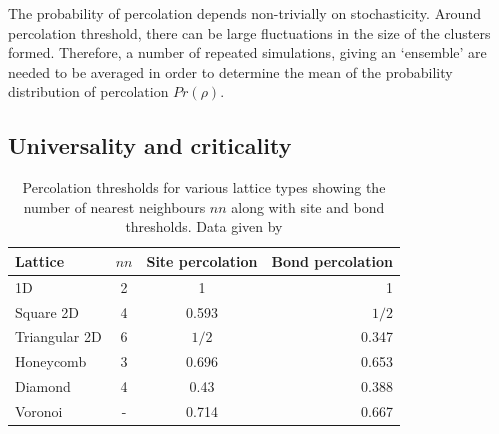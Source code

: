 The probability of percolation depends non-trivially on stochasticity. %
Around percolation threshold, there can be large fluctuations in the size of the clusters formed. %
Therefore, a number of repeated simulations, giving an `ensemble' \cite{gibbs1902elementary} are %
needed to be averaged in order to determine the mean of the probability distribution of percolation $Pr(\rho)$.

\subsection{Universality and criticality}
\label{section:universality}
\begin{table}[h!]
  \begin{center}
    \begin{tabular}{l|c|c|r} %
    \hline
      \textbf{Lattice} & $nn$ & \textbf{Site percolation} & \textbf{Bond percolation}\\
      \hline
      1D & 2 & 1 & 1\\
      Square 2D & 4 & 0.593 & $1/2$\\
      Triangular 2D & 6 & $1/2$ & 0.347\\
      Honeycomb & 3 & 0.696 & 0.653\\
      Diamond & 4 & 0.43 & 0.388\\
      Voronoi & - & 0.714 & 0.667\\
    \hline
    \end{tabular}
    \caption{Percolation thresholds for various lattice types showing the number of nearest neighbours $nn$ along with site and bond thresholds. Data given by \cite{stauffer2018introduction, PhysRevE.80.041101}}
    \label{tab:perc}
  \end{center}
\end{table}

